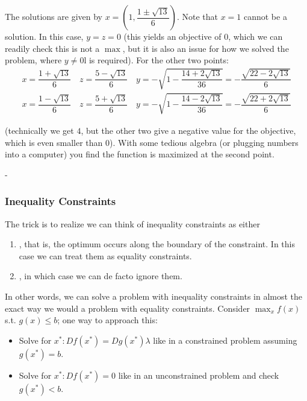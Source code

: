 \documentclass{article}
\begin{document}
\begin{example}
  The solutions are given by $x = \left(1, \dfrac{1 \pm \sqrt{13}}{6}\right)$. Note that $x = 1$ cannot be a solution. In this case, $y = z = 0$ (this yields an objective of $0$, which we can readily check this is not a $\max$, but it is also an issue for how we solved the problem, where $y \ne 0$l is required). For the other two points:
  \begin{align*}
    x = \dfrac{1 + \sqrt{13}}{6}
    \quad
    z = \dfrac{5 - \sqrt{13}}{6}
    \quad
    y
    = - \sqrt{1 - \dfrac{14 + 2 \sqrt{13}}{36}}
    = - \dfrac{\sqrt{22 - 2 \sqrt{13}}}{6}
    \\
    x = \dfrac{1 - \sqrt{13}}{6}
    \quad
    z = \dfrac{5 + \sqrt{13}}{6}
    \quad
    y
    = - \sqrt{1 - \dfrac{14 - 2 \sqrt{13}}{36}}
    = - \dfrac{\sqrt{22 + 2 \sqrt{13}}}{6}
  \end{align*}

  (technically we get $4$, but the other two give a negative value for the objective, which is even smaller than $0$). With some tedious algebra (or plugging numbers into a computer) you find the function is maximized at the second point.
\end{example}
- 
\subsubsection{Inequality Constraints}
\label{ssub:inequality_constraints}

The trick is to realize we can think of inequality constraints as either
\begin{enumerate}
  \item {}, that is, the optimum occurs along the boundary of the constraint. In this case we can treat them as equality constraints.

  \item {}, in which case we can de facto ignore them.
\end{enumerate}

In other words, we can solve a problem with inequality constraints in almost the exact way we would a problem with equality constraints. Consider $\max_x f(x)$ s.t. $g(x) \le b$; one way to approach this:
\begin{itemize}[label=$\bullet$]
  \item Solve for $x^*: D f(x^*) = D g(x^*) \lambda$ like in a constrained problem assuming $g(x^*) = b$.
  \item Solve for $x^*: D f(x^*) = 0$ like in an unconstrained problem and check $g(x^*) < b$.
\end{itemize}
\end{document}
